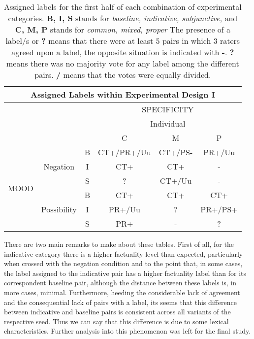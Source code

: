 \begin{table}[h!]
\centering
\begin{tabular}{|c|c|c|c|c|c|}
\hline
\multicolumn{6}{|c|}{Assigned Labels within Experimental Design I}\\\hline
& & &\multicolumn{3}{c|}{SPECIFICITY} \\\cline{4-6}
& & &\multicolumn{3}{c|}{Individual}\\\cline{4-6} 
                     & & & C & M & P \\\hline
\multirow{6}{*}{MOOD} &\multirow{3}{*}{Negation} & B & CT+/PR+/Uu & CT+/PS- & PR+/Uu \\\cline{3-6}
&& I & CT+ & CT+ & - \\\cline{3-6}
&& S & ? & CT+/Uu & - \\\cline{2-6}
&\multirow{3}{*}{Possibility}& B & CT+ & CT+ & CT+ \\\cline{3-6}
&& I & PR+/Uu & ? & PR+/PS+ \\\cline{3-6}
&& S & PR+ & - & ? \\ 
\hline
\end{tabular}
\caption[Assigned labels I.]{Assigned labels for the first half of each combination of experimental categories. \textbf{B, I, S} stands for \textit{baseline, indicative, subjunctive}, and \textbf{C, M, P} stands for \textit{common, mixed, proper} The presence of a label/s or \textbf{?} means that there were at least 5 pairs in which 3 raters agreed upon a label, the opposite situation is indicated with \textbf{-}. \textbf{?} means there was no majority vote for any label among the different pairs. \textbf{/} means that the votes were equally divided.}
\label{tab:ass1}
\end{table}

There are two main remarks to make about these tables. First of all, for the indicative category there is a higher factuality level than expected, particularly when crossed with the negation condition and to the point that, in some cases, the label assigned to the indicative pair has a higher factuality label than for its correspondent baseline pair, although the distance between these labels is, in more cases, minimal. Furthermore, heeding the considerable lack of agreement and the consequential lack of pairs with a label, its seems that this difference between indicative and baseline pairs is consistent across all variants of the respective seed. Thus we can say that this difference is due to some lexical characteristics. Further analysis into this phenomenon was left for the final study.\\

